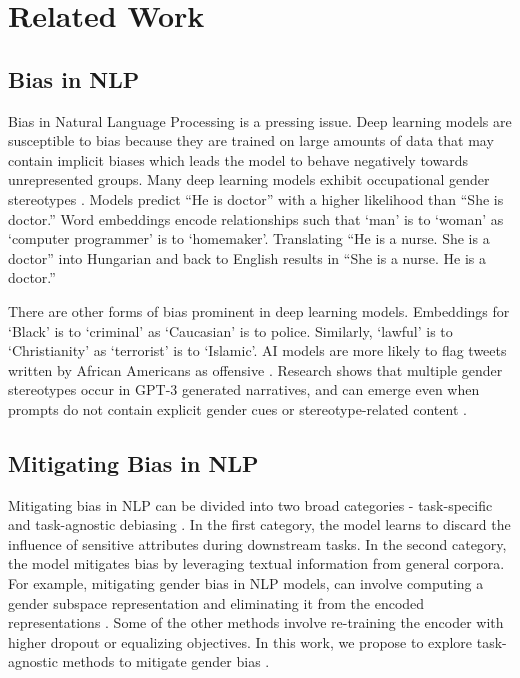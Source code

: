 \documentclass[11pt]{article}
\begin{document}
\section{Related Work}

\subsection{Bias in NLP} 

Bias in Natural Language Processing is a pressing issue. Deep learning models are susceptible to bias because they are trained on large amounts of data that may contain implicit biases which leads the model to behave negatively towards unrepresented groups. Many deep learning models exhibit occupational gender stereotypes \cite{sun-etal-2019-mitigating}. Models predict “He is doctor” with a higher likelihood than “She is doctor.” Word embeddings encode relationships such that `man' is to `woman' as `computer programmer' is to `homemaker'. Translating “He is a nurse. She is a doctor” into Hungarian and back to English results in “She is a nurse. He is a doctor.” 

There are other forms of bias prominent in deep learning models. Embeddings for `Black' is to `criminal' as `Caucasian' is to police. Similarly, `lawful' is to `Christianity' as `terrorist' is to `Islamic'. AI models are more likely to flag tweets written by African Americans as offensive \cite{manzini-etal-2019-black}. Research shows that multiple gender stereotypes occur in GPT-3 generated narratives, and can emerge even when prompts do not contain explicit gender cues or stereotype-related content \cite{lucy-bamman-2021-gender}.


\subsection{Mitigating Bias in NLP}

Mitigating bias in NLP can be divided into two broad categories - task-specific and task-agnostic debiasing \cite{he2022mabel}. In the first category, the model learns to discard the influence of sensitive attributes during downstream tasks. In the second category, the model mitigates bias by leveraging textual information from general corpora. For example, mitigating gender bias in NLP models, can involve computing a gender subspace representation and eliminating it from the encoded representations \cite{https://doi.org/10.48550/arxiv.1607.06520}. Some of the other methods involve re-training the encoder with higher dropout or equalizing objectives. In this work, we propose to explore task-agnostic methods to mitigate gender bias \cite{gira-etal-2022-debiasing}.
\end{document}
